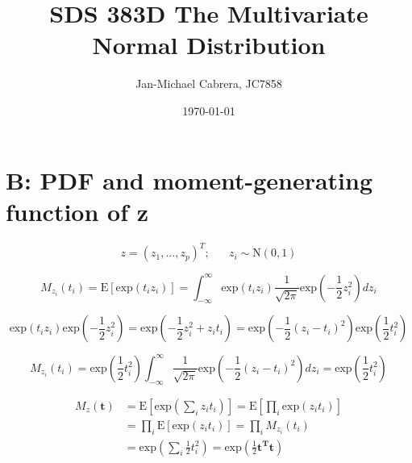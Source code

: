 \documentclass[12pt]{article}
\begin{document}
    \title{SDS 383D The Multivariate Normal Distribution}
    \author{Jan-Michael Cabrera, JC7858}
    \date{\today}
    \maketitle

    \section*{B: PDF and moment-generating function of z}

        \begin{equation}
            z = (z_1,...,z_p)^T; \hspace{20pt} z_i \sim \text{N}(0,1)
        \end{equation}

        \begin{equation}
            M_{z_i}(t_i) = \text{E}[\text{exp}(t_i z_i)] = \int_{-\infty}^\infty \text{exp}(t_i z_i) \frac{1}{\sqrt{2 \pi}} \text{exp}\left( -\frac{1}{2} z_i^2 \right) dz_i
        \end{equation}

        \begin{equation}
            \text{exp}(t_i z_i) \text{exp}\left( -\frac{1}{2} z_i^2 \right) = \text{exp}\left( -\frac{1}{2} z_i^2 + z_i t_i\right) = \text{exp}\left( -\frac{1}{2}(z_i - t_i)^2 \right) \text{exp} \left (\frac{1}{2} t_i^2 \right)
        \end{equation}

        \begin{equation}
            M_{z_i}(t_i) = \text{exp}\left( \frac{1}{2} t_i^2\right) \int_{-\infty}^{\infty} \frac{1}{\sqrt{2\pi}} \text{exp}\left( - \frac{1}{2} (z_i - t_i)^2\right) dz_i = \text{exp}\left( \frac{1}{2}t_i^2 \right )
        \end{equation}

        \begin{align}
            M_z(\mathbf{t}) &= \text{E}\left[\text{exp}\left(\sum_i z_i t_i\right)\right] = \text{E}\left[ \prod_i \text{exp}(z_i t_i)\right]\\
            &= \prod_i \text{E}[\text{exp}(z_i t_i)] = \prod_i M_{z_i}(t_i)\\
            &= \text{exp}\left( \sum_i \frac{1}{2} t_i^2 \right) = \text{exp}\left ( \frac{1}{2} \mathbf{t^Tt}\right)
        \end{align}
\end{document}

